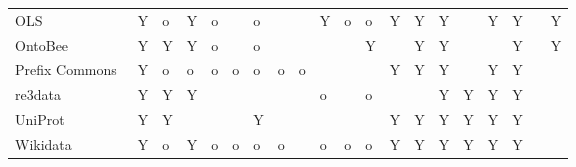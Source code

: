 \begin{table}
\begin{tabular}{llllllllllllllllllll}
                   OLS~\cite{Cote2006a} &              Y &        o &     Y &          o &            &        o &                &               &       Y &       o &       o &                          Y &         Y &                 Y &                    &             Y &               Y &                &             Y \\
                 OntoBee~\cite{Ong2017} &              Y &        Y &     Y &          o &            &        o &                &               &         &         &       Y &                            &         Y &                 Y &                    &               &               Y &                &             Y \\
    Prefix Commons~\cite{prefixcommons} &              Y &        o &     o &          o &          o &        o &              o &             o &         &         &         &                          Y &         Y &                 Y &                    &             Y &               Y &                &               \\
              re3data~\cite{Pampel2013} &              Y &        Y &     Y &            &            &          &                &               &       o &         &       o &                            &           &                 Y &                  Y &             Y &               Y &                &               \\
             UniProt~\cite{Bateman2021} &              Y &        Y &       &            &            &        Y &                &               &         &         &         &                          Y &         Y &                 Y &                  Y &             Y &               Y &                &               \\
        Wikidata~\cite{Waagmeester2020} &              Y &        o &     Y &          o &          o &        o &              o &               &       o &       o &       o &                          Y &         Y &                 Y &                  Y &             Y &               Y &                &               \\
\bottomrule
\end{tabular}
\end{table}
